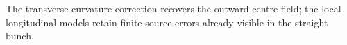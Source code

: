 The transverse curvature correction recovers the outward centre field; the local longitudinal models retain finite-source errors already visible in the straight bunch.
